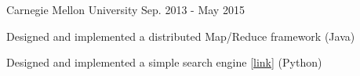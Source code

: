 

\begin{cventries}

  \cvsimpleentry
    {} %
    {Carnegie Mellon University} %
    {} %
    {Sep. 2013 - May 2015} %
     {
      \begin{cvitems} %
        \item {Designed and implemented a distributed Map/Reduce framework (Java)}
        \item {Designed and implemented a simple search engine [\href{https://www.youtube.com/watch?v=WJ1t9i2Kdh4&feature=youtu.be}{{link}}] (Python)}
      \end{cvitems}
    }


\end{cventries}
